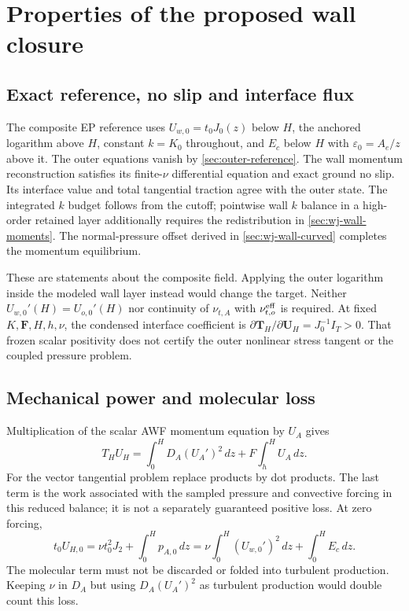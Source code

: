 \documentclass[11pt,a4paper]{article}
\numberwithin{equation}{section}
\newcommand{\eps}{\varepsilon}
\begin{document}
\section{Properties of the proposed wall closure}
\label{sec:wall-properties}
\subsection{Exact reference, no slip and interface flux}
The composite EP reference uses $U_{w,0}=t_0J_0(z)$ below $H$,
the anchored logarithm above $H$, constant $k=K_0$ throughout, and
$E_c$ below $H$ with $\eps_0=A_e/z$ above it. The outer equations
vanish by \cref{sec:outer-reference}. The wall momentum reconstruction
satisfies its finite-$\nu$ differential equation and exact ground
no slip. Its interface value and total tangential traction agree with
the outer state. The integrated $k$ budget follows from the cutoff;
pointwise wall $k$ balance in a high-order retained layer additionally
requires the redistribution in \cref{sec:wj-wall-moments}.
The normal-pressure offset derived in \cref{sec:wj-wall-curved}
completes the momentum equilibrium.

These are statements about the composite field. Applying the outer
logarithm inside the modeled wall layer instead would change the
target. Neither $U_{w,0}'(H)=U_{o,0}'(H)$ nor continuity of
$\nu_{t,A}$ with $\nu_{t,o}^{\rm eff}$ is required.
At fixed $K,\bm F,H,h,\nu$, the condensed interface coefficient is
$\partial\bm T_H/\partial\bm U_H=J_0^{-1}I_T>0$.
That frozen scalar positivity does not certify the outer nonlinear
stress tangent or the coupled pressure problem.

\subsection{Mechanical power and molecular loss}
Multiplication of the scalar AWF momentum equation by $U_A$ gives
\begin{equation}
 T_HU_H=\int_0^H D_A(U_A')^2\,dz
              +F\int_h^H U_A\,dz.
 \label{eq:forced-wall-power}
\end{equation}
For the vector tangential problem replace products by dot products.
The last term is the work associated with the sampled pressure and
convective forcing in this reduced balance; it is not a separately
guaranteed positive loss. At zero forcing,
\begin{equation}
 t_0U_{H,0}
 =\nu t_0^2J_2+\int_0^Hp_{A,0}\,dz
 =\nu\int_0^H(U_{w,0}')^2\,dz+\int_0^HE_c\,dz.
 \label{eq:wall-power-reference}
\end{equation}
The molecular term must not be discarded or folded into turbulent
production. Keeping $\nu$ in $D_A$ but using $D_A(U_A')^2$ as turbulent
production would double count this loss.
\end{document}
